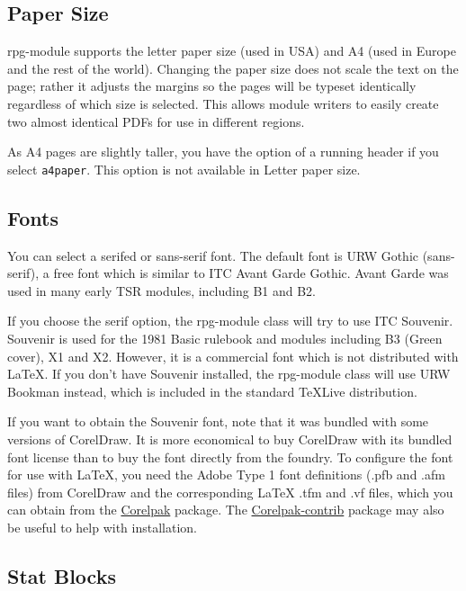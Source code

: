 \documentclass[letterpaper,serif]{rpg-module}
\begin{document}
\subsection*{Paper Size}

rpg-module supports the letter paper size (used in USA) and A4 (used in Europe and the rest of the world). Changing the paper size
does not scale the text on the page; rather it adjusts the margins so the pages will be typeset identically regardless
of which size is selected. This allows module writers to easily create two almost identical PDFs for use in different regions.

As A4 pages are slightly taller, you have the option of a running header if you select \verb|a4paper|. This option is not available
in Letter paper size.

\subsection*{Fonts}

You can select a serifed or sans-serif font. The default font is URW Gothic (sans-serif), a free font which is similar to
ITC Avant Garde Gothic. Avant Garde was used in many early TSR modules, including B1 and B2.

If you choose the serif option, the rpg-module class will try to use ITC Souvenir. Souvenir is used for the 1981 Basic rulebook
and modules including B3 (Green cover), X1 and X2. However, it is a commercial font which is
not distributed with \LaTeX. If you don't have Souvenir installed, the rpg-module class will use URW Bookman instead, which is
included in the standard \TeX Live distribution.

If you want to obtain the Souvenir font, note that it was bundled with some versions of CorelDraw. It is more economical to buy
CorelDraw with its bundled font license than to buy the font directly from the foundry.
To configure the font for use with \LaTeX, you need the Adobe Type 1 font definitions (.pfb and .afm files) from CorelDraw
and the corresponding LaTeX .tfm and .vf files, which you can obtain from the \href{https://www.ctan.org/pkg/corelpak}{Corelpak} package. The
\href{https://www.ctan.org/pkg/corelpak-contrib}{Corelpak-contrib} package may also be useful to help with installation.

\subsection*{Stat Blocks}
\end{document}
